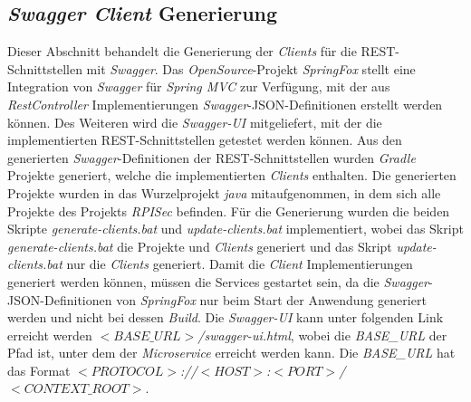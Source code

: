\documentclass[]{article}
\begin{document}
{{{{\subsection{\emph{Swagger Client} Generierung}
\label{sec:swagger-client-generation}
Dieser Abschnitt behandelt die Generierung der \emph{Clients} für die REST-Schnittstellen mit \emph{Swagger}. Das \emph{OpenSource}-Projekt \emph{SpringFox} stellt eine Integration von \emph{Swagger} für \emph{Spring MVC} zur Verfügung, mit der aus \emph{RestController} Implementierungen \emph{Swagger}-JSON-Definitionen erstellt werden können. Des Weiteren wird die \emph{Swagger-UI} mitgeliefert, mit der die implementierten REST-Schnittstellen getestet werden können.
\newline
\newline
Aus den generierten \emph{Swagger}-Definitionen der REST-Schnittstellen wurden \emph{Gradle} Projekte generiert, welche die implementierten \emph{Clients} enthalten. Die generierten Projekte wurden in das Wurzelprojekt \emph{java} mitaufgenommen, in dem sich alle Projekte des Projekts \emph{RPISec} befinden.
\newline
\newline
Für die Generierung wurden die beiden Skripte \emph{generate-clients.bat} und \emph{update-clients.bat} implementiert, wobei das Skript \emph{generate-clients.bat} die Projekte und \emph{Clients} generiert und das Skript \emph{update-clients.bat} nur die \emph{Clients} generiert. Damit die \emph{Client} Implementierungen generiert werden können, müssen die Services gestartet sein, da die \emph{Swagger}-JSON-Definitionen von \emph{SpringFox} nur beim Start der Anwendung generiert werden und nicht bei dessen \emph{Build}.
\newline
\newline
Die \emph{Swagger-UI} kann unter folgenden Link erreicht werden \emph{$<BASE\_URL>$/swagger-ui.html}, wobei die \emph{BASE\_URL} der Pfad ist, unter dem der \emph{Microservice} erreicht werden kann. Die \emph{BASE\_URL} hat das Format \emph{$<PROTOCOL>$://$<HOST>$:$<PORT>$/$<CONTEXT\_ROOT>$}. 
\newpage

}}}}
\end{document}
